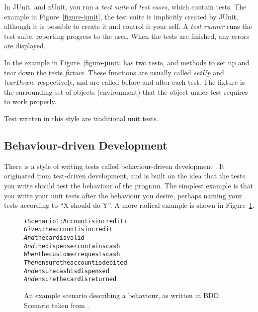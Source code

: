 \documentclass[a4paper,11pt]{kth-mag}
\begin{document}
In JUnit, and xUnit, you run a \textit{test suite} of \textit{test cases},
which contain tests. The example in Figure~\ref{figure-junit}, the test suite
is implicitly created by JUnit, although it is possible to create it and
control it your self. A \textit{test runner} runs the test suite, reporting
progress to the user.  When the tests are finished, any errors are displayed.

In the example in Figure~\ref{figure-junit} has two tests, and methods to set
up and tear down the tests \textit{fixture}. These functions are usually called
\textit{setUp} and \textit{tearDown}, respectively, and are called before and
after each test. The fixture is the surrounding set of objects (environment)
that the object under test requires to work properly.

Test written in this style are traditional unit tests.


\subsection{Behaviour-driven Development}

There is a style of writing tests called behaviour-driven development
\cite{north06bdd}. It originated from test-driven development, and is built on
the idea that the tests you write should test the behaviour of the program. The
simplest example is that you write your unit tests after the behaviour you
desire, perhaps naming your tests according to ``X should do Y''. A more radical
example is shown in Figure~\ref{figure-bdd}.

\begin{figure}[h!]
	\begin{center}
	\begin{minipage}{0.7\textwidth}
\begin{alltt}
+Scenario 1: Account is in credit+
\textit{Given} the account is in credit
\textit{And} the card is valid
\textit{And} the dispenser contains cash
\textit{When} the customer requests cash
\textit{Then} ensure the account is debited
\textit{And} ensure cash is dispensed
\textit{And} ensure the card is returned
\end{alltt}
	\end{minipage}
	\end{center}

\caption{An example scenario describing a behaviour, as written in BDD.
Scenario taken from \cite{north06bdd}.}
\label{figure-bdd}
\end{figure}
\end{document}
